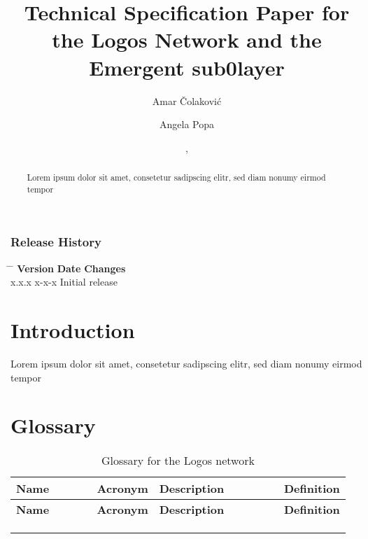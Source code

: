 \documentclass[]{article}
\title{Technical Specification Paper for the Logos Network and the Emergent sub0layer}
\author[1]{Amar Čolaković}
\author[1]{Angela Popa}
\author[2]{}
\affil[1]{LogosLabs}
\affil[2]{}
\date{,}
\newcommand{\releasehistory}{
	\subsubsection*{Release History}
	\begin{tabbing}
		\hspace{2cm} \= \hspace{2cm} \= \kill
		\textbf{Version} \> \textbf{Date} \> \textbf{Changes} \\
		x.x.x \> x-x-x \> Initial release \\
	\end{tabbing}
}
\begin{document}
\maketitle

\begin{abstract}
Lorem ipsum dolor sit amet, consetetur sadipscing elitr, sed diam nonumy eirmod tempor       
\end{abstract}

\releasehistory

\tableofcontents
\newpage

\section{Introduction}
Lorem ipsum dolor sit amet, consetetur sadipscing elitr, sed diam nonumy eirmod tempor 

\newpage
\printbibliography %
\newpage

\newpage
\section*{Glossary}
\begin{longtable}{p{0.3\linewidth} p{0.1\linewidth} p{0.45\linewidth} p{0.1\linewidth}}
	\textbf{Name}&\textbf{Acronym}&\textbf{Description}&\textbf{Definition}\newline \\ \hline
	\endfirsthead
	\textbf{Name}&\textbf{Acronym}&\textbf{Description}&\textbf{Definition}\newline \\ \hline
	\endhead

 &  &  &   \\ %
 &  &  &   \\ %

	\caption{Glossary for the Logos network}
\end{longtable}
\end{document}
